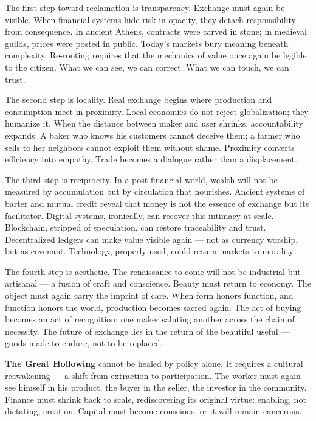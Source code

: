 \documentclass[11pt,twoside]{book}
\begin{document}
\bigskip

The first step toward reclamation is transparency.  
Exchange must again be visible.  
When financial systems hide risk in opacity, they detach responsibility from consequence.  
In ancient Athens, contracts were carved in stone; in medieval guilds, prices were posted in public.  
Today’s markets bury meaning beneath complexity.  
Re-rooting requires that the mechanics of value once again be legible to the citizen.  
What we can see, we can correct.  
What we can touch, we can trust.

The second step is locality.  
Real exchange begins where production and consumption meet in proximity.  
Local economies do not reject globalization; they humanize it.  
When the distance between maker and user shrinks, accountability expands.  
A baker who knows his customers cannot deceive them; a farmer who sells to her neighbors cannot exploit them without shame.  
Proximity converts efficiency into empathy.  
Trade becomes a dialogue rather than a displacement.

The third step is reciprocity.  
In a post-financial world, wealth will not be measured by accumulation but by circulation that nourishes.  
Ancient systems of barter and mutual credit reveal that money is not the essence of exchange but its facilitator.  
Digital systems, ironically, can recover this intimacy at scale.  
Blockchain, stripped of speculation, can restore traceability and trust.  
Decentralized ledgers can make value visible again — not as currency worship, but as covenant.  
Technology, properly used, could return markets to morality.

The fourth step is aesthetic.  
The renaissance to come will not be industrial but artisanal — a fusion of craft and conscience.  
Beauty must return to economy.  
The object must again carry the imprint of care.  
When form honors function, and function honors the world, production becomes sacred again.  
The act of buying becomes an act of recognition: one maker saluting another across the chain of necessity.  
The future of exchange lies in the return of the beautiful useful — goods made to endure, not to be replaced.

\textbf{The Great Hollowing} cannot be healed by policy alone.  
It requires a cultural reawakening — a shift from extraction to participation.  
The worker must again see himself in his product, the buyer in the seller, the investor in the community.  
Finance must shrink back to scale, rediscovering its original virtue: enabling, not dictating, creation.  
Capital must become conscious, or it will remain cancerous.
\end{document}
